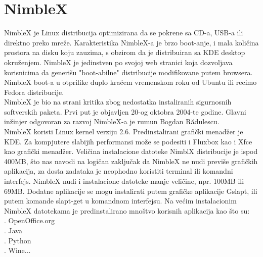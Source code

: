 \documentclass[12pt,vi]{mitthesis}
\begin{document}
\section*{NimbleX}
\indent
NimbleX je Linux distribucija optimizirana da se pokrene sa CD-a, USB-a ili direktno preko mreže. Karakteristika NimbleX-a je brzo boot-anje, i mala količina prostora na disku koju zauzima, s obzirom da je distribuiran sa KDE desktop okruženjem. NimbleX je jedinstven po svojoj web stranici koja dozvoljava korisnicima da generišu "boot-abilne" distribucije modifikovane putem browsera. NimbleX boot-a u otprilike duplo kraćem vremenskom roku od Ubuntu ili recimo Fedora distribucije.\\
NimbleX je bio na strani kritika zbog nedostatka instaliranih sigurnosnih softverskih paketa. Prvi put je objavljen 20-og oktobra 2004-te godine. Glavni inžinjer odgovoran za razvoj NimbleX-a je rumun Bogdan Rădulescu.\\
\indent
NimbleX koristi Linux kernel verziju 2.6. Predinstalirani grafički menadžer je KDE. Za kompjutere slabijih performansi može se podesiti i Fluxbox kao i Xfce kao grafički menadžer. Veličina instalacione datoteke NimblX distribucije je ispod 400MB, što nas navodi na logičan zaključak da NimbleX ne nudi previše grafičkih aplikacija, za dosta zadataka je neophodno koristiti terminal ili komandni interfejs. NimbleX nudi i instalacione datoteke manje veličine, npr. 100MB ili 69MB. Dodatne aplikacije se mogu instalirati putem grafičke aplikacije Gslapt, ili putem komande slapt-get u komandnom interfejsu. Na većim instalacionim NimbleX datotekama je predinstalirano mnoštvo korisnih aplikacija kao što su:\\
. OpenOffice.org\\
. Java\\
. Python\\
. Wine...
\end{document}
